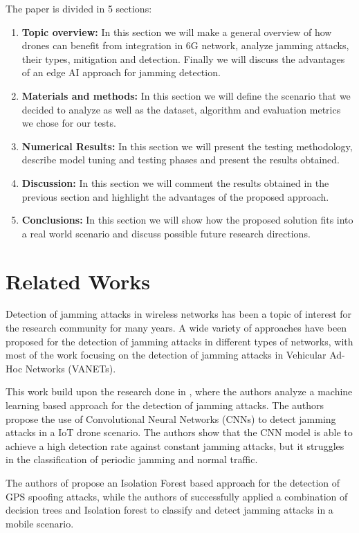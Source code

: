 \documentclass[futureinternet,article,submit,pdftex,moreauthors]{Definitions/mdpi}
\begin{document}
The paper is divided in 5 sections: 
\begin{enumerate}
	\item \textbf{Topic overview:} In this section we will make a general overview of how drones can benefit from integration in 6G network, analyze jamming attacks, their types, mitigation and detection. Finally we will discuss the advantages of an edge AI approach for jamming detection. 
	\item \textbf{Materials and methods:} In this section we will define the scenario that we decided to analyze as well as the dataset, algorithm and evaluation metrics we chose for our tests. 
	\item \textbf{Numerical Results:} In this section we will present the testing methodology, describe model tuning and testing phases and present the results obtained. 
	\item \textbf{Discussion:} In this section we will comment the results obtained in the previous section and highlight the advantages of the proposed approach. 
	\item \textbf{Conclusions:} In this section we will show how the proposed solution fits into a real world scenario and discuss possible future research directions.
\end{enumerate}

\section{Related Works}

Detection of jamming attacks in wireless networks has been a topic of interest for the research community for many years. A wide variety of approaches have been proposed for the detection of jamming attacks 
in different types of networks, with most of the work focusing on the detection of jamming attacks in Vehicular Ad-Hoc Networks (VANETs)\cite{VANETsAI-Lyamin}.

This work build upon the research done in \cite{JammingDetectionIoT-Hussain}, where the authors analyze a machine learning based approach for the detection of jamming attacks. 
The authors propose the use of Convolutional Neural Networks (CNNs) to detect jamming attacks in a IoT drone scenario. The authors show that the CNN model is able to achieve a high detection rate against constant jamming attacks, but it 
struggles in the classification of periodic jamming and normal traffic. 

The authors of \cite{GPSSpoofingDetection-Zuo} propose an Isolation Forest based approach for the detection of GPS spoofing attacks, while the authors of \cite{HybridJammingDetection-Hong} successfully applied a combination of decision trees and Isolation forest to classify 
and detect jamming attacks in a mobile scenario. 
\end{document}
